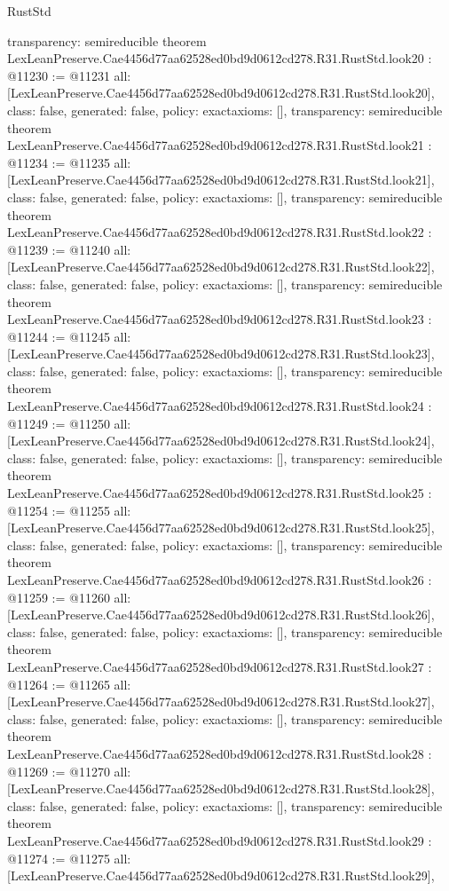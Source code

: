 \begin{lexlean}{RustStd}
\begin{coremodule}
{  transparency: semireducible
}
theorem LexLeanPreserve.Cae4456d77aa62528ed0bd9d0612cd278.R31.RustStd.look20 : @11230 := @11231 {
  all: [LexLeanPreserve.Cae4456d77aa62528ed0bd9d0612cd278.R31.RustStd.look20],
  class: false,
  generated: false,
  policy: exact{axioms: []},
  transparency: semireducible
}
theorem LexLeanPreserve.Cae4456d77aa62528ed0bd9d0612cd278.R31.RustStd.look21 : @11234 := @11235 {
  all: [LexLeanPreserve.Cae4456d77aa62528ed0bd9d0612cd278.R31.RustStd.look21],
  class: false,
  generated: false,
  policy: exact{axioms: []},
  transparency: semireducible
}
theorem LexLeanPreserve.Cae4456d77aa62528ed0bd9d0612cd278.R31.RustStd.look22 : @11239 := @11240 {
  all: [LexLeanPreserve.Cae4456d77aa62528ed0bd9d0612cd278.R31.RustStd.look22],
  class: false,
  generated: false,
  policy: exact{axioms: []},
  transparency: semireducible
}
theorem LexLeanPreserve.Cae4456d77aa62528ed0bd9d0612cd278.R31.RustStd.look23 : @11244 := @11245 {
  all: [LexLeanPreserve.Cae4456d77aa62528ed0bd9d0612cd278.R31.RustStd.look23],
  class: false,
  generated: false,
  policy: exact{axioms: []},
  transparency: semireducible
}
theorem LexLeanPreserve.Cae4456d77aa62528ed0bd9d0612cd278.R31.RustStd.look24 : @11249 := @11250 {
  all: [LexLeanPreserve.Cae4456d77aa62528ed0bd9d0612cd278.R31.RustStd.look24],
  class: false,
  generated: false,
  policy: exact{axioms: []},
  transparency: semireducible
}
theorem LexLeanPreserve.Cae4456d77aa62528ed0bd9d0612cd278.R31.RustStd.look25 : @11254 := @11255 {
  all: [LexLeanPreserve.Cae4456d77aa62528ed0bd9d0612cd278.R31.RustStd.look25],
  class: false,
  generated: false,
  policy: exact{axioms: []},
  transparency: semireducible
}
theorem LexLeanPreserve.Cae4456d77aa62528ed0bd9d0612cd278.R31.RustStd.look26 : @11259 := @11260 {
  all: [LexLeanPreserve.Cae4456d77aa62528ed0bd9d0612cd278.R31.RustStd.look26],
  class: false,
  generated: false,
  policy: exact{axioms: []},
  transparency: semireducible
}
theorem LexLeanPreserve.Cae4456d77aa62528ed0bd9d0612cd278.R31.RustStd.look27 : @11264 := @11265 {
  all: [LexLeanPreserve.Cae4456d77aa62528ed0bd9d0612cd278.R31.RustStd.look27],
  class: false,
  generated: false,
  policy: exact{axioms: []},
  transparency: semireducible
}
theorem LexLeanPreserve.Cae4456d77aa62528ed0bd9d0612cd278.R31.RustStd.look28 : @11269 := @11270 {
  all: [LexLeanPreserve.Cae4456d77aa62528ed0bd9d0612cd278.R31.RustStd.look28],
  class: false,
  generated: false,
  policy: exact{axioms: []},
  transparency: semireducible
}
theorem LexLeanPreserve.Cae4456d77aa62528ed0bd9d0612cd278.R31.RustStd.look29 : @11274 := @11275 {
  all: [LexLeanPreserve.Cae4456d77aa62528ed0bd9d0612cd278.R31.RustStd.look29],
}
\end{coremodule}
\end{lexlean}
